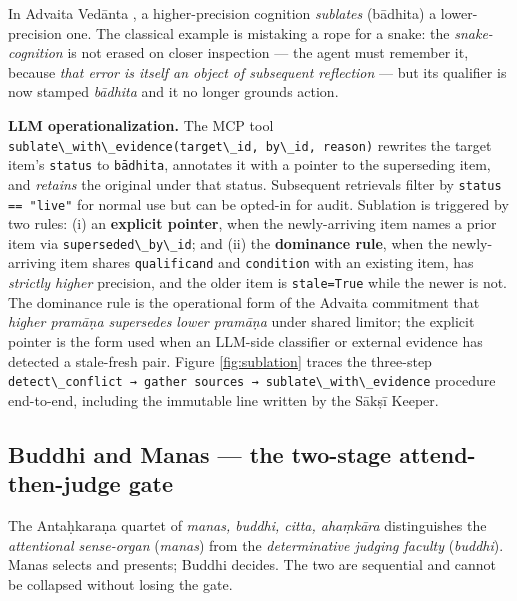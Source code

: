 In Advaita Vedānta \citep{deutsch1969advaita, shaw1990bada, dharmaraja17vedantaparibhasa, sankaraupadesha}, a higher-precision cognition \emph{sublates} (bādhita) a lower-precision one. The classical example is mistaking a rope for a snake: the \emph{snake-cognition} is not erased on closer inspection --- the agent must remember it, because \emph{that error is itself an object of subsequent reflection} --- but its qualifier is now stamped \emph{bādhita} and it no longer grounds action.

\textbf{LLM operationalization.} The MCP tool \passthrough{\lstinline!sublate\_with\_evidence(target\_id, by\_id, reason)!} rewrites the target item's \passthrough{\lstinline!status!} to \passthrough{\lstinline!bādhita!}, annotates it with a pointer to the superseding item, and \emph{retains} the original under that status. Subsequent retrievals filter by \passthrough{\lstinline!status == "live"!} for normal use but can be opted-in for audit. Sublation is triggered by two rules: (i) an \textbf{explicit pointer}, when the newly-arriving item names a prior item via \passthrough{\lstinline!superseded\_by\_id!}; and (ii) the \textbf{dominance rule}, when the newly-arriving item shares \passthrough{\lstinline!qualificand!} and \passthrough{\lstinline!condition!} with an existing item, has \emph{strictly higher} precision, and the older item is \passthrough{\lstinline!stale=True!} while the newer is not. The dominance rule is the operational form of the Advaita commitment that \emph{higher pramāṇa supersedes lower pramāṇa} under shared limitor; the explicit pointer is the form used when an LLM-side classifier or external evidence has detected a stale-fresh pair. Figure \ref{fig:sublation} traces the three-step \passthrough{\lstinline!detect\_conflict → gather sources → sublate\_with\_evidence!} procedure end-to-end, including the immutable line written by the Sākṣī Keeper.



\subsection{Buddhi and Manas --- the two-stage attend-then-judge gate}\label{buddhi-and-manas-the-two-stage-attend-then-judge-gate}

The Antaḥkaraṇa quartet of \emph{manas, buddhi, citta, ahaṃkāra} \citep{deutsch1969advaita, ramprasad2013advaita, datta1932advaita} distinguishes the \emph{attentional sense-organ} (\emph{manas}) from the \emph{determinative judging faculty} (\emph{buddhi}). Manas selects and presents; Buddhi decides. The two are sequential and cannot be collapsed without losing the gate.

